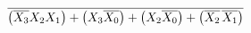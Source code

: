 \documentclass[preview]{standalone}
\begin{document}
\begin{align*}
\overline{\left(\overline{X_3}X_2X_1\right)+\left(X_3\overline{X_0}\right)+\left(X_2\overline{X_0}\right)+\left(\overline{X_2}\hspace{0.05cm}\overline{X_1}\right)}
\end{align*}
\end{document}
